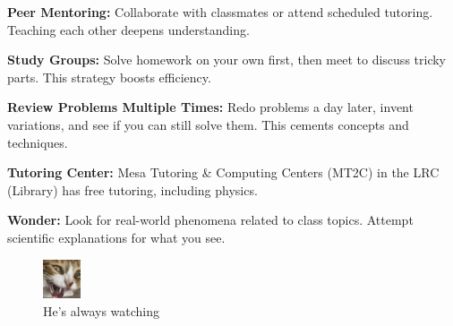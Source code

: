 \documentclass[12pt]{article}
\begin{document}
\noindent
\textbf{Peer Mentoring:} Collaborate with classmates or attend scheduled tutoring. Teaching each other deepens understanding.

\noindent
\textbf{Study Groups:} Solve homework on your own first, then meet to discuss tricky parts. This strategy boosts efficiency.

\noindent
\textbf{Review Problems Multiple Times:} Redo problems a day later, invent variations, and see if you can still solve them. This cements concepts and techniques.

\noindent
\textbf{Tutoring Center:} Mesa Tutoring \& Computing Centers (MT2C) in the LRC (Library) has free tutoring, including physics.

\noindent
\textbf{Wonder:} Look for real-world phenomena related to class topics. Attempt scientific explanations for what you see.

\begin{figure}[h] %
\centering
\includegraphics[width=0.1\textwidth]{cat.png} %
\caption*{He's always watching}
\label{fig:always_watching} %
\end{figure}
\end{document}
